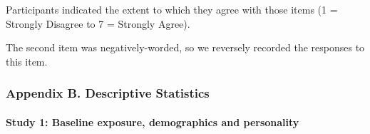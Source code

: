 \documentclass[
  singlecolumn,
  9pt]{article}
\let\oldparagraph\paragraph
\renewcommand{\paragraph}[1]{\oldparagraph{#1}\mbox{}}
\begin{document}
Participants indicated the extent to which they agree with those items
(1 = Strongly Disagree to 7 = Strongly Agree).

The second item was negatively-worded, so we reversely recorded the
responses to this item.

\newpage{}

\subsubsection{Appendix B. Descriptive
Statistics}\label{appendix-b.-descriptive-statistics}

\paragraph{Study 1: Baseline exposure, demographics and
personality}\label{study-1-baseline-exposure-demographics-and-personality}
\end{document}
